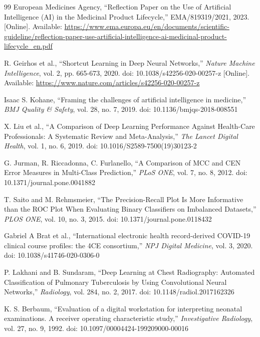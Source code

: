 \documentclass[lettersize,journal]{IEEEtran}
\begin{document}
\begin{thebibliography}{99}
European Medicines Agency,
``Reflection Paper on the Use of Artificial Intelligence (AI) in the Medicinal Product Lifecycle,''
EMA/819319/2021, 2023.
[Online]. Available: \url{https://www.ema.europa.eu/en/documents/scientific-guideline/reflection-paper-use-artificial-intelligence-ai-medicinal-product-lifecycle_en.pdf}

R. Geirhos et al.,
``Shortcut Learning in Deep Neural Networks,''
\textit{Nature Machine Intelligence}, vol. 2, pp. 665-673, 2020.
doi: 10.1038/s42256-020-00257-z
[Online]. Available: \url{https://www.nature.com/articles/s42256-020-00257-z}

Isaac S. Kohane,
``Framing the challenges of artificial intelligence in medicine,''
\textit{BMJ Quality \& Safety}, vol. 28, no. 7, 2019.
doi: 10.1136/bmjqs-2018-008551

X. Liu et al.,
``A Comparison of Deep Learning Performance Against Health-Care Professionals: A Systematic Review and Meta-Analysis,''
\textit{The Lancet Digital Health}, vol. 1, no. 6, 2019.
doi: 10.1016/S2589-7500(19)30123-2

G. Jurman, R. Riccadonna, C. Furlanello,
``A Comparison of MCC and CEN Error Measures in Multi-Class Prediction,''
\textit{PLoS ONE}, vol. 7, no. 8, 2012.
doi: 10.1371/journal.pone.0041882

T. Saito and M. Rehmsmeier,
``The Precision-Recall Plot Is More Informative than the ROC Plot When Evaluating Binary Classifiers on Imbalanced Datasets,''
\textit{PLOS ONE}, vol. 10, no. 3, 2015.
doi: 10.1371/journal.pone.0118432

Gabriel A Brat et al.,
``International electronic health record-derived COVID-19 clinical course profiles: the 4CE consortium,''
\textit{NPJ Digital Medicine}, vol. 3, 2020.
doi: 10.1038/s41746-020-0306-0

P. Lakhani and B. Sundaram,
``Deep Learning at Chest Radiography: Automated Classification of Pulmonary Tuberculosis by Using Convolutional Neural Networks,''
\textit{Radiology}, vol. 284, no. 2, 2017.
doi: 10.1148/radiol.2017162326

K. S. Berbaum,
``Evaluation of a digital workstation for interpreting neonatal examinations. A receiver operating characteristic study,''
\textit{Investigative Radiology}, vol. 27, no. 9, 1992.
doi: 10.1097/00004424-199209000-00016


\end{thebibliography}
\end{document}

